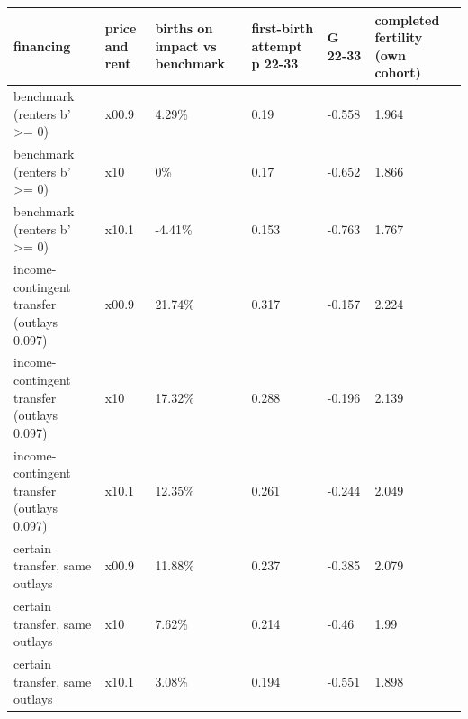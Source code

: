 \begingroup\small
\setlength{\tabcolsep}{3pt}
\renewcommand{\arraystretch}{1.04}
\begin{tabularx}{\linewidth}{XXXXXX}
\toprule
financing & price and rent & births on impact vs benchmark & first-birth attempt p 22-33 & G 22-33 & completed fertility (own cohort) \\
\midrule
benchmark (renters b' \textgreater{}= 0) & x00.9 & 4.29\% & 0.19 & -0.558 & 1.964 \\
benchmark (renters b' \textgreater{}= 0) & x10 & 0\% & 0.17 & -0.652 & 1.866 \\
benchmark (renters b' \textgreater{}= 0) & x10.1 & -4.41\% & 0.153 & -0.763 & 1.767 \\
income-contingent transfer (outlays 0.097) & x00.9 & 21.74\% & 0.317 & -0.157 & 2.224 \\
income-contingent transfer (outlays 0.097) & x10 & 17.32\% & 0.288 & -0.196 & 2.139 \\
income-contingent transfer (outlays 0.097) & x10.1 & 12.35\% & 0.261 & -0.244 & 2.049 \\
certain transfer, same outlays & x00.9 & 11.88\% & 0.237 & -0.385 & 2.079 \\
certain transfer, same outlays & x10 & 7.62\% & 0.214 & -0.46 & 1.99 \\
certain transfer, same outlays & x10.1 & 3.08\% & 0.194 & -0.551 & 1.898 \\
\bottomrule
\end{tabularx}
\endgroup
